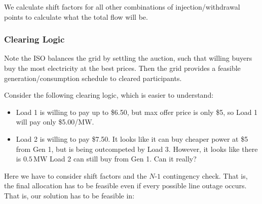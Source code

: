 \documentclass[11pt]{article}
\begin{document}
We calculate shift factors for all other combinations of injection/withdrawal points to calculate what the total flow will be.

\subsubsection*{Clearing Logic}

Note the ISO balances the grid by settling the auction, such that willing buyers buy the most electricity at the best prices. Then the grid provides a feasible generation/consumption schedule to cleared participants.

Consider the following clearing logic, which is easier to understand:
\begin{itemize}
  \item Load 1 is willing to pay up to \$6.50, but max offer price is only \$5, so Load 1 will pay only \$5.00/MW.
  \item Load 2 is willing to pay \$7.50. It looks like it can buy cheaper power at \$5 from Gen 1, but is being outcompeted by Load 3. However, it looks like there is $0.5\,\mathrm{MW}$ Load 2 can still buy from Gen 1. Can it really?
\end{itemize}

Here we have to consider shift factors and the $N$-$1$ contingency check. That is, the final allocation has to be feasible even if every possible line outage occurs. That is, our solution has to be feasible in:
\end{document}
